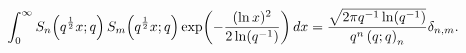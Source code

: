 \[\int_{0}^{\infty}\mathop{S_{n}\/}\nolimits\!\left(q^{\frac{1}{2}}x;q\right)%
\mathop{S_{m}\/}\nolimits\!\left(q^{\frac{1}{2}}x;q\right)\mathop{\exp\/}%
\nolimits\!\left(-\frac{(\mathop{\ln\/}\nolimits x)^{2}}{2\mathop{\ln\/}%
\nolimits\!\left(q^{-1}\right)}\right)dx=\frac{\sqrt{2\pi q^{-1}\mathop{\ln\/}%
\nolimits\!\left(q^{-1}\right)}}{q^{n}\left(q;q\right)_{n}}\delta_{n,m}.\]